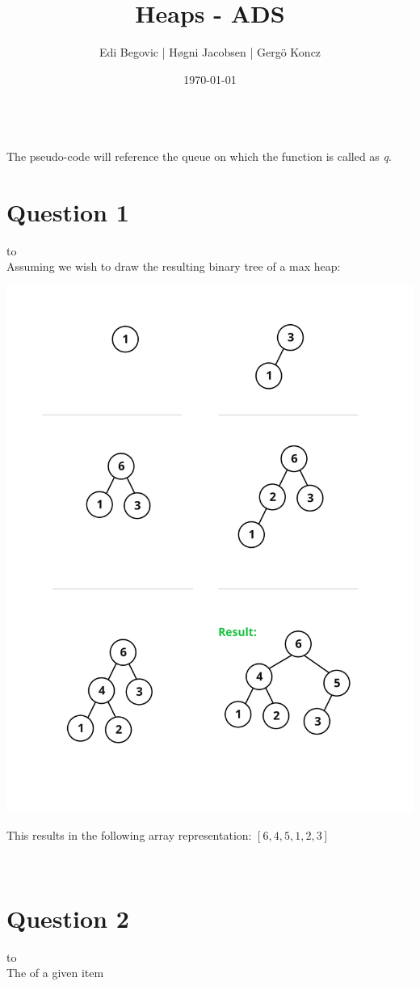 \documentclass[a4paper]{article}
\title{Heaps - ADS}
\author{Edi Begovic | Høgni Jacobsen | Gergö Koncz}
\date{\today}
\def\headline#1{\hbox to \hsize{\hrulefill\quad\lower.3em\hbox{#1}\quad\hrulefill}}
\begin{document}
 
\maketitle

\ \\
\noindent
The pseudo-code will reference the queue on which the function is called as \textit{q}.
\ \\
\section*{Question 1}
\headline{1} \ \\
Assuming we wish to draw the resulting binary tree of a max heap:
\ \\
\begin{center}
\includegraphics[scale=0.16]{figure1.png}
\end{center}

\noindent
This results in the following array representation: 
$[6, 4, 5, 1, 2, 3]$


\ \\
\section*{Question 2}
\headline{2} \ \\

\noindent
The of a given item 
\end{document}
